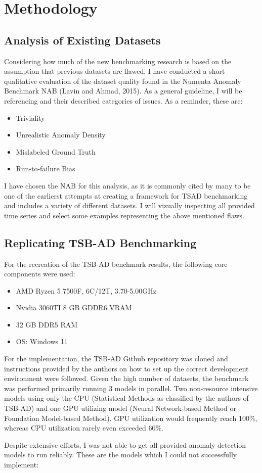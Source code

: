 \documentclass[12pt,oneside]{article}
\begin{document}
\section{Methodology}

\subsection{Analysis of Existing Datasets}

Considering how much of the new benchmarking research is based on the assumption that previous datasets are flawed, I have conducted a short qualitative evaluation of the dataset quality found in the Numenta Anomaly Benchmark NAB (Lavin and Ahmad, 2015). As a general guideline, I will be referencing \cite{wu2021current} and their described categories of issues. As a reminder, these are:

\begin{itemize}
    \item Triviality
    \item Unrealistic Anomaly Density
    \item Mislabeled Ground Truth
    \item Run-to-failure Bias
\end{itemize}

I have chosen the NAB for this analysis, as it is commonly cited by many to be one of the earlierst attempts at creating a framework for TSAD benchmarking and includes a variety of different datasets. I will vizually inspecting all provided time series and select some examples representing the above mentioned flaws.

\subsection{Replicating TSB-AD Benchmarking}

For the recreation of the TSB-AD benchmark results, the following core components were used:
\begin{itemize}
    \item AMD Ryzen 5 7500F, 6C/12T, 3.70-5.00GHz
    \item Nvidia 3060TI 8 GB GDDR6 VRAM
    \item 32 GB DDR5 RAM
    \item OS: Windows 11
\end{itemize}

For the implementation, the TSB-AD Github repository was cloned and instructions provided by the authors on how to set up the correct development environment were followed. Given the high number of datasets, the benchmark was performed primarily running 3 models in parallel. Two non-resource intensive models using only the CPU (Statistical Methods as classified by the authors of TSB-AD) and one GPU utilizing model (Neural Network-based Method or Foundation Model-based Method). GPU utilization would frequently reach 100\%, whereas CPU utilization rarely even exceeded 60\%.\par
Despite extensive efforts, I was not able to get all provided anomaly detection models to run reliably. These are the models which I could not successfully implement:
\end{document}
